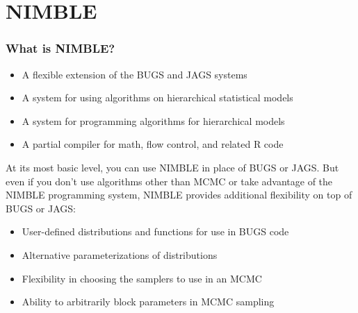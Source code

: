 \documentclass{beamer}\usepackage[]{graphicx}\usepackage[]{color}
\begin{document}
\section{NIMBLE}

\begin{frame}[fragile] 
\sffamily
\frametitle{What is NIMBLE?}

\begin{itemize}
\item A flexible extension of the BUGS and JAGS systems
\item A system for using algorithms on hierarchical statistical models
\item A system for programming algorithms for hierarchical models
\item A partial compiler for math, flow control, and related R code
\end{itemize}

At its most basic level, you can use NIMBLE in place of BUGS or JAGS. But even if you don't use algorithms other than MCMC or take advantage of the NIMBLE programming system, NIMBLE provides additional flexibility on top of BUGS or JAGS:

\begin{itemize}
\item User-defined distributions and functions for use in BUGS code
\item Alternative parameterizations of distributions
\item Flexibility in choosing the samplers to use in an MCMC
\item Ability to arbitrarily block parameters in MCMC sampling
\end{itemize}

\end{frame}
\end{document}
